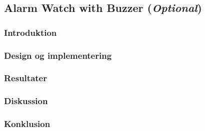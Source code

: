 {
    \newcommand{\labelprefix}{src6-5}

\subsection{Alarm Watch with Buzzer (\emph{Optional})}

\subsubsection{Introduktion}

\subsubsection{Design og implementering}

\subsubsection{Resultater}


\subsubsection{Diskussion}

\subsubsection{Konklusion}
   
}